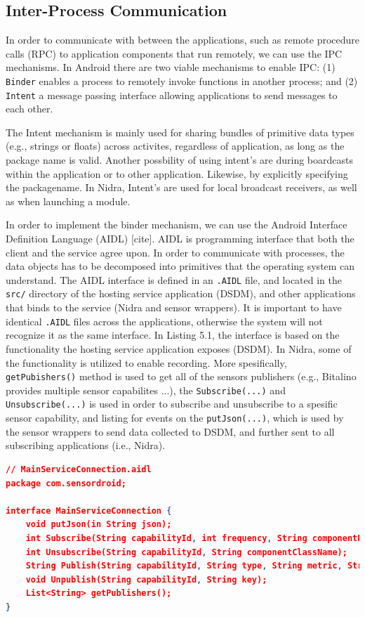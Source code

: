 \subsection{Inter-Process Communication}\label{implement:aidl}
In order to communicate with between the applications, such as remote procedure calls (RPC) to application components that run remotely, we can use the IPC mechanisms. In Android there are two viable mechanisms to enable IPC: (1) \verb|Binder| enables a process to remotely invoke functions in another process; and (2) \verb|Intent| a message passing interface allowing applications to send messages to each other.

The Intent mechanism is mainly used for sharing bundles of primitive data types (e.g., strings or floats) across activites, regardless of application, as long as the package name is valid. Another possbility of using intent's are during boardcasts within the application or to other application. Likewise, by explicitly specifying the packagename. In Nidra, Intent's are used for local broadcast receivers, as well as when launching a module. 

In order to implement the binder mechanism, we can use the Android Interface Definition Language (AIDL) [cite]. AIDL is programming interface that both the client and the service agree upon. In order to communicate with processes, the data objects has to be decomposed into primitives that the operating system can understand. The AIDL interface is defined in an \verb|.AIDL| file, and located in the \verb|src/| directory of the hosting service application (DSDM), and other applications that binds to the service (Nidra and sensor wrappers). It is important to have identical \verb|.AIDL| files across the applications, otherwise the system will not recognize it as the same interface. In Listing 5.1, the interface is based on the functionality the hosting service application exposes (DSDM). In Nidra, some of the functionality is utilized to enable recording. More spesifically, \verb|getPubishers()| method is used to get all of the sensors publishers (e.g., Bitalino provides multiple sensor capabilites ...), the \verb|Subscribe(...)| and \verb|Unsubscribe(...)| is used in order to subscribe and unsubscribe to a spesific sensor capability, and listing for events on the \verb|putJson(...)|, which is used by the sensor wrappers to send data collected to DSDM, and further sent to all subscribing applications (i.e., Nidra). 

\begin{lstlisting}[language=json, caption={My Caption}, captionpos=b]
// MainServiceConnection.aidl
package com.sensordroid;

interface MainServiceConnection {
    void putJson(in String json);
    int Subscribe(String capabilityId, int frequency, String componentPackageName, String componentClassName);
    int Unsubscribe(String capabilityId, String componentClassName);
    String Publish(String capabilityId, String type, String metric, String description);
    void Unpublish(String capabilityId, String key);
    List<String> getPublishers();
}
\end{lstlisting}


